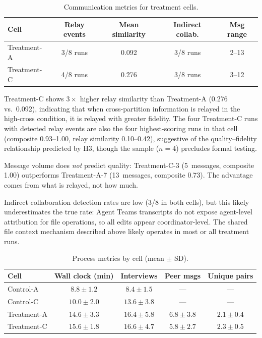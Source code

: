 \documentclass[11pt,letterpaper]{article}
\begin{document}
\begin{table}[t]
  \caption{Communication metrics for treatment cells.}
  \label{tab:comms}
  \centering\small
  \begin{tabular}{lcccc}
    \toprule
    \textbf{Cell} & \textbf{Relay events}
      & \textbf{Mean similarity} & \textbf{Indirect collab.}
      & \textbf{Msg range} \\
    \midrule
    Treatment-A & 3/8 runs & 0.092 & 3/8 runs & 2--13 \\
    Treatment-C & 4/8 runs & 0.276 & 3/8 runs & 3--12 \\
    \bottomrule
  \end{tabular}
\end{table}

Treatment-C shows $3\times$ higher relay similarity than Treatment-A
(0.276 vs.\ 0.092), indicating that when cross-partition information
is relayed in the high-cross condition, it is relayed with greater
fidelity. The four Treatment-C runs with detected relay events are
also the four highest-scoring runs in that cell (composite 0.93--1.00,
relay similarity 0.10--0.42), suggestive of the quality--fidelity
relationship predicted by H3, though the sample ($n = 4$) precludes
formal testing.

Message volume does \emph{not} predict quality: Treatment-C-3
(5~messages, composite 1.00) outperforms Treatment-A-7 (13~messages,
composite 0.73). The advantage comes from what is relayed, not how
much.

Indirect collaboration detection rates are low (3/8 in both cells),
but this likely underestimates the true rate: Agent Teams transcripts
do not expose agent-level attribution for file operations, so all
edits appear coordinator-level. The shared file context mechanism
described above likely operates in most or all treatment runs.

\begin{table}[t]
  \caption{Process metrics by cell (mean $\pm$ SD).}
  \label{tab:process}
  \centering\small
  \begin{tabular}{lcccc}
    \toprule
    \textbf{Cell} & \textbf{Wall clock (min)}
      & \textbf{Interviews} & \textbf{Peer msgs}
      & \textbf{Unique pairs} \\
    \midrule
    Control-A   & $8.8 \pm 1.2$  & $8.4 \pm 1.5$  & --- & --- \\
    Control-C   & $10.0 \pm 2.0$ & $13.6 \pm 3.8$ & --- & --- \\
    Treatment-A & $14.6 \pm 3.3$ & $16.4 \pm 5.8$ & $6.8 \pm 3.8$ & $2.1 \pm 0.4$ \\
    Treatment-C & $15.6 \pm 1.8$ & $16.6 \pm 4.7$ & $5.8 \pm 2.7$ & $2.3 \pm 0.5$ \\
    \bottomrule
  \end{tabular}
\end{table}
\end{document}
